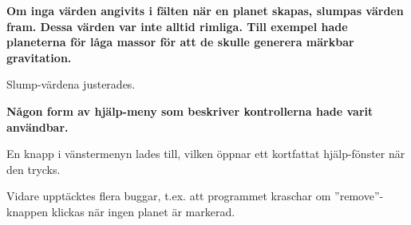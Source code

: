 \vspace{6pt}

\textbf{Om inga värden angivits i fälten när en planet skapas, slumpas värden 
fram. Dessa värden var inte alltid rimliga.
Till exempel hade planeterna för låga massor för att de skulle generera
märkbar gravitation.}

Slump-värdena justerades.

\vspace{6pt}

\textbf{Någon form av hjälp-meny som beskriver kontrollerna hade
varit användbar.}

En knapp i vänstermenyn lades till, vilken öppnar ett kortfattat
hjälp-fönster när den trycks.

\vspace{6pt}

Vidare upptäcktes flera buggar, t.ex. att programmet kraschar om
''remove''-knappen klickas när ingen planet är markerad.



